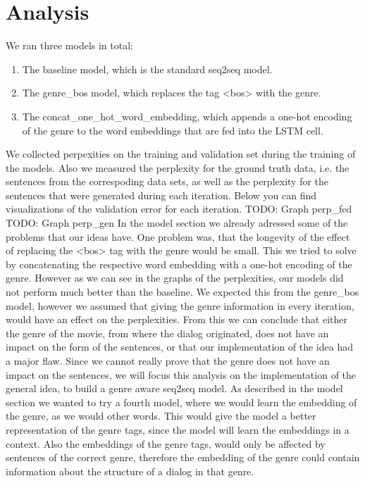 \section{Analysis}
%
We ran three models in total:
%
\begin{enumerate}
    \item The baseline model, which is the standard seq2seq model.
    \item The genre_bos model, which replaces the tag <bos> with the genre.
    \item The concat_one_hot_word_embedding, which appends a one-hot encoding of the genre to the word embeddings that are fed into the LSTM cell. 
\end{enumerate}
%
We collected perpexities on the training and validation set during the training of the models.
%
Also we measured the perplexity for the ground truth data, i.e. the sentences from the correspoding data sets, as well as the perplexity for the sentences that were generated during each iteration.
%
Below you can find visualizations of the validation error for each iteration.
%
\newline
%
TODO: Graph perp_fed \newline
%
TODO: Graph perp_gen \newline
%
In the model section we already adressed some of the problems that our ideas have. 
%
One problem was, that the longevity of the effect of replacing the <bos> tag with the genre would be small.
%
This we tried to solve by concatenating the respective word embedding with a one-hot encoding of the genre. 
%
However as we can see in the graphs of the perplexities, our models did not perform much better than the baseline.
%
We expected this from the genre_bos model, however we assumed that giving the genre information in every iteration, would have an effect on the perplexities.
%
From this we can conclude that either the genre of the movie, from where the dialog originated, does not have an impact on the form of the sentences, or that our implementation of the idea had a major flaw.
%
Since we cannot really prove that the genre does not have an impact on the sentences, we will focus this analysis on the implementation of the general idea, to build a genre aware seq2seq model.
%
As described in the model section we wanted to try a fourth model, where we would learn the embedding of the genre, as we would other words.
%
This would give the model a better representation of the genre tags, since the model will learn the embeddings in a context.
%
Also the embeddings of the genre tags, would only be affected by sentences of the correct genre, therefore the embedding of the genre could contain information about the structure of a dialog in that genre.

